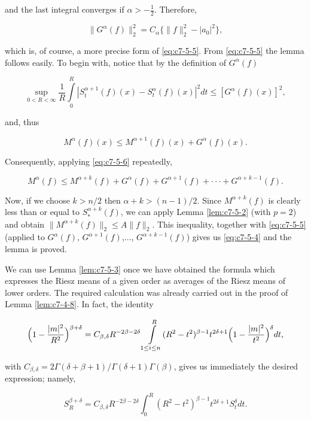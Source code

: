 and the last integral converges if $\alpha > -\frac{1}{2}$. Therefore,

\[
\|G^{\alpha}(f)\|_{2}^{2}=C_{\alpha}\{\|f\|_{2}^{2}-|a_{0}|^{2}\},
\]

which is, of course, a more precise form of \eqref{eq:c7-5-5}. From \eqref{eq:c7-5-5} the lemma follows easily. To begin with, notice that by the definition of $G^{\alpha}(f)$

\[
\sup_{0<R<\infty}\frac{1}{R}\int\limits_{0}^{R}\left|S_{t}^{\alpha+1}(f)(x)-S_{t}^{\alpha}(f)(x)\right|^{2}d t\leq[G^{\alpha}(f)(x)]^{2},
\]

and, thus

\begin{equation}\label{eq:c7-5-6}
M^{\alpha}(f)(x)\leq M^{\alpha+1}(f)(x)+G^{\alpha}(f)(x).
\end{equation}

Consequently, applying \eqref{eq:c7-5-6} repeatedly,

\begin{equation}\label{eq:c7-5-7}
M^{\alpha}(f)\leq M^{\alpha+k}(f)+G^{\alpha}(f)+G^{\alpha+1}(f)+\cdot\cdot\cdot+G^{\alpha+k-1}(f).
\end{equation}

Now, if we choose $k > n/2$ then $\alpha + k > (n-1)/2$. Since $M^{\alpha+k}(f)$ is clearly less than or equal to $S_{*}^{\alpha+k}(f)$, we can apply Lemma \ref{lem:c7-5-2} (with $p = 2$) and obtain $\|M^{\alpha+k}(f)\|_{2} \leq A\|f\|_{2}$. This inequality, together with \eqref{eq:c7-5-5} (applied to $G^{\alpha}(f)$, $G^{\alpha+1}(f)$,..., $G^{\alpha+k-1}(f)$) gives us \eqref{eq:c7-5-4} and the lemma is proved.

We can use Lemma \ref{lem:c7-5-3} once we have obtained the formula which expresses the Riesz means of a given order as averages of the Riesz means of lower orders. The required calculation was already carried out in the proof of Lemma \ref{lem:c7-4-8}. In fact, the identity

\[
\Bigl(1-\frac{|m|^{2}}{R^{2}}\Bigr)^{\beta+\delta}=C_{\beta,\delta}R^{-2\beta-2\delta}\intop_{1\leq i\leq n}^{R}(R^{2}-t^{2})^{\beta-1}t^{2\delta+1}\Bigl(1-\frac{|m|^{2}}{t^{2}}\Bigr)^{\delta}d t,
\]

with $C_{\beta,\delta} = 2\Gamma(\delta + \beta + 1)/\Gamma(\delta + 1)\Gamma(\beta)$, gives us immediately the desired expression; namely,

\begin{equation}\label{eq:c7-5-8}
S_{R}^{\beta+\delta}=C_{\beta,\delta}R^{-2\beta-2\delta}\int_{0}^{R}(R^{2}-t^{2})^{\beta-1}t^{2\delta+1}S_{t}^{\delta}d t.
\end{equation}

